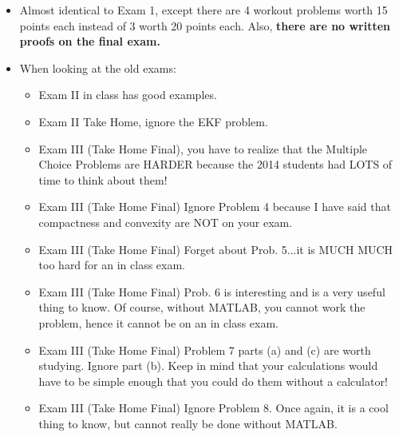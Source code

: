 \documentclass[letterpaper]{article}
\begin{document}
\begin{itemize}

\item Almost identical to Exam 1, except there are 4 workout problems worth 15 points each instead of 3 worth 20 points each. Also, \textbf{there are no written proofs on the final exam.}

    \item When looking at the old exams:
    \begin{itemize}
    \item  Exam II in class has good examples.
    \item  Exam II Take Home, ignore the EKF problem.
    \item  Exam III (Take Home Final), you have to realize that the Multiple Choice Problems are HARDER because the 2014 students had LOTS of time to think about them!
\item  Exam III (Take Home Final) Ignore Problem 4 because I have said that compactness and convexity are NOT on your exam.
\item  Exam III (Take Home Final) Forget about Prob. 5...it is MUCH MUCH too hard for an in class exam.
\item  Exam III (Take Home Final) Prob. 6 is interesting and is a very useful thing to know. Of course, without MATLAB, you cannot work the problem, hence it cannot be on an in class exam.
    \item  Exam III (Take Home Final) Problem 7 parts (a) and (c) are worth studying. Ignore part (b). Keep in mind that your calculations would have to be simple enough that you could do them without a calculator!
        \item  Exam III (Take Home Final)  Ignore Problem 8. Once again, it is a cool thing to know, but cannot really be done without MATLAB.

    \end{itemize}


\end{itemize}
\end{document}
